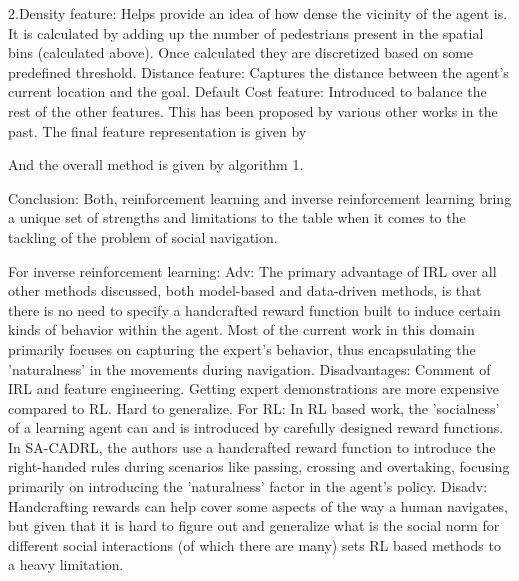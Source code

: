 2.Density feature: Helps provide an idea of how dense the vicinity of the agent is. It is calculated by adding up the number of pedestrians present in the spatial bins (calculated above). Once calculated they are discretized based on some predefined threshold.
Distance feature: Captures the distance between the agent's current location and the goal.
Default Cost feature: Introduced to balance the rest of the other features. This has been proposed by various other works in the past.
The final feature representation is given by 

And the overall method is given by algorithm 1.


Conclusion:
Both, reinforcement learning and inverse reinforcement learning bring a unique set of strengths and limitations to the table when it comes to the tackling of the problem of social navigation. 

For inverse reinforcement learning:
Adv:
The primary advantage of IRL over all other methods discussed, both model-based and data-driven methods, is that there is no need to specify a handcrafted reward function built to induce certain kinds of behavior within the agent. Most of the current work in this domain primarily focuses on capturing the expert's behavior, thus encapsulating the 'naturalness' in the movements during navigation.
Disadvantages:
Comment of IRL and feature engineering. 
Getting expert demonstrations are more expensive compared to RL.
Hard to generalize. 
For RL:
In RL based work, the 'socialness' of a learning agent can and is introduced by carefully designed reward functions. In SA-CADRL, the authors use a handcrafted reward function to introduce the right-handed rules during scenarios like passing, crossing and overtaking, focusing primarily on introducing the 'naturalness' factor in the agent's policy.
Disadv:
Handcrafting rewards can help cover some aspects of the way a human navigates, but given that it is hard to figure out and generalize what is the social norm for different social interactions (of which there are many) sets RL based methods to a heavy limitation.